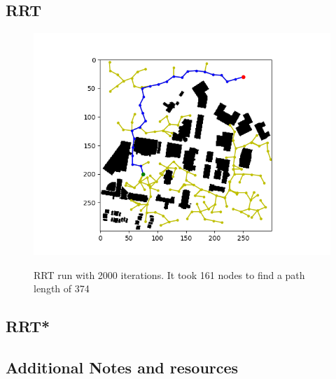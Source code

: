 \documentclass[journal]{IEEEtran}
\begin{document}
    \subsection{RRT}
    \begin{figure}[H]
        \includegraphics[width=\linewidth]{figures/RRT.png}
        \label{fig:RRT}
        \caption{RRT run with 2000 iterations. It took 161 nodes to find a path length of 374}
    \end{figure}
    \subsection{RRT*}

    \subsection{Additional Notes and resources}


    \newpage



    \printbibliography
\end{document}
